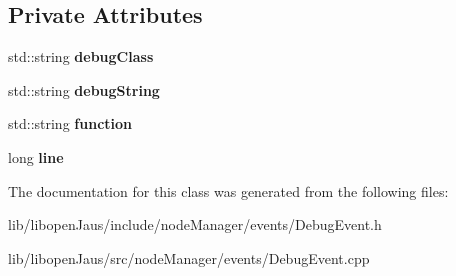 \subsection*{\-Private \-Attributes}
\begin{DoxyCompactItemize}
\item 
\hypertarget{class_debug_event_a854446b80910c58668d20fb68e462e69}{std\-::string {\bfseries debug\-Class}}\label{class_debug_event_a854446b80910c58668d20fb68e462e69}

\item 
\hypertarget{class_debug_event_a3dda6c10de2fab36a39486782238010d}{std\-::string {\bfseries debug\-String}}\label{class_debug_event_a3dda6c10de2fab36a39486782238010d}

\item 
\hypertarget{class_debug_event_a48dfa167cc47368ea5a7a52f521cd3bd}{std\-::string {\bfseries function}}\label{class_debug_event_a48dfa167cc47368ea5a7a52f521cd3bd}

\item 
\hypertarget{class_debug_event_a8f8f1456b9a55d047588f409a45a96c1}{long {\bfseries line}}\label{class_debug_event_a8f8f1456b9a55d047588f409a45a96c1}

\end{DoxyCompactItemize}


\-The documentation for this class was generated from the following files\-:\begin{DoxyCompactItemize}
\item 
lib/libopen\-Jaus/include/node\-Manager/events/\-Debug\-Event.\-h\item 
lib/libopen\-Jaus/src/node\-Manager/events/\-Debug\-Event.\-cpp\end{DoxyCompactItemize}
